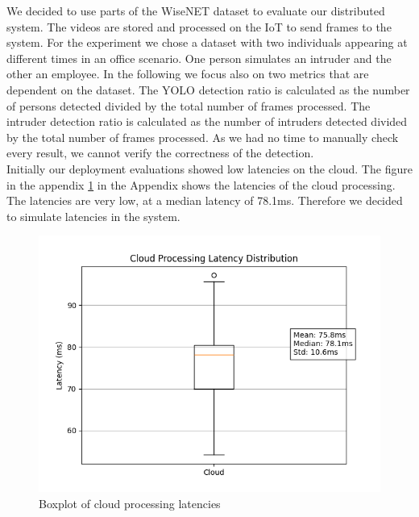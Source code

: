 \documentclass[conference]{IEEEtran}
\begin{document}
We decided to use parts of the WiseNET dataset to evaluate our distributed system. The videos are stored and processed on the IoT to send frames to the system. For the experiment we chose a dataset with two individuals appearing at different times in an office scenario.  One person simulates an intruder and the other an employee.
In the following we focus also on two metrics that are dependent on the dataset. The YOLO detection ratio is calculated as the number of persons detected divided by the total number of frames processed. The intruder detection ratio is calculated as the number of intruders detected divided by the total number of frames processed. 
As we had no time to manually check every result, we cannot verify the correctness of the detection. 
\\

Initially our deployment evaluations showed low latencies on the cloud. The figure in the appendix \ref{fig:cloud_latencies_old} in the Appendix shows the latencies of the cloud processing. The latencies are very low, at a median latency of 78.1ms. Therefore we decided to simulate latencies in the system. 

\begin{figure}[!h]
    \centering
    \includegraphics[width=1\linewidth]{./res/evaluation_without_latencies/cloud_latencies_old.png}
    \caption{Boxplot of cloud processing latencies}
    \label{fig:cloud_latencies_old}
\end{figure}
\end{document}
